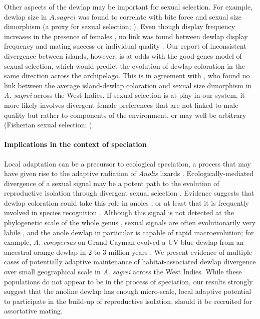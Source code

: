 Other aspects of the dewlap may be important for sexual selection. For example, dewlap size in $A. sagrei$ was found to correlate with bite force \citep{Vanhooydonck2005} and sexual size dimorphism (a proxy for sexual selection; \citealt{Vanhooydonck2009}). Even though display frequency increases in the presence of females \citep{Driessens2014}, no link was found between dewlap display frequency and mating success \citep{Tokarz2002, Tokarz2005} or individual quality \citep{Driessens2015}. Our report of inconsistent divergence between islands, however, is at odds with the good-genes model of sexual selection, which would predict the evolution of dewlap coloration in the same direction across the archipelago. This is in agreement with \citet{Baeckens2018}, who found no link between the average island-dewlap coloration and sexual size dimorphism in \textit{A. sagrei} across the West Indies. If sexual selection is at play in our system, it more likely involves divergent female preferences that are not linked to male quality but rather to components of the environment, or may well be arbitrary (Fisherian sexual selection; \citealt{Andersson1994}).


\paragraph{Implications in the context of speciation} Local adaptation can be a precursor to ecological speciation, a process that may have given rise to the adaptive radiation of \textit{Anolis} lizards \citep{Harmon2003, Gavrilets2009}. Ecologically-mediated divergence of a sexual signal may be a potent path to the evolution of reproductive isolation through divergent sexual selection \citep{Reynolds2007, Servedio2011}. Evidence suggests that dewlap coloration could take this role in anoles \citep{Ng2011, Lambert2013, Geneva2015, Ng2017}, or at least that it is frequently involved in species recognition \citep{Williams1969, Williams1977, Losos1985, Macedonia1994, Fleishman2000, Macedonia2013, Ingram2016, Baeckens2018}. Although this signal is not detected at the phylogenetic scale of the whole genus \citep{Nicholson2007, Harrison2012, Ingram2016}, sexual signals are often evolutionarily very labile \citep{Kraaijeveld2011}, and the anole dewlap in particular is capable of rapid macroevolution; for example, \textit{A. conspersus} on Grand Cayman evolved a UV-blue dewlap from an ancestral orange dewlap in 2 to 3 million years \citep{Macedonia2001}. We present evidence of multiple cases of potentially adaptive maintenance of habitat-associated dewlap divergence over small geographical scale in \textit{A. sagrei} across the West Indies. While these populations do not appear to be in the process of speciation, our results strongly suggest that the anoline dewlap has enough micro-scale, local adaptive potential to participate in the build-up of reproductive isolation, should it be recruited for assortative mating.